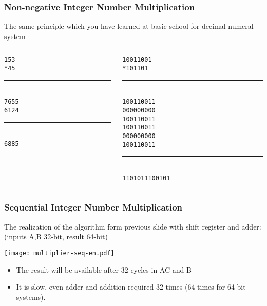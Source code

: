 \documentclass{beamer}
\begin{document}
\begin{frame}
\frametitle{Non-negative Integer Number Multiplication}

The same principle which you have learned at basic school for decimal numeral system
\begin{columns}
\begin{column}{0.4\textwidth}
\texttt{\phantom{xxx}153\phantom{xx}}\\
\texttt{\phantom{xxx}*45\phantom{xx}}\\
\vspace{-8pt}
\rule[0pt]{1.5cm}{0.1pt}\\
\texttt{\phantom{xxx}765\phantom{x}5}\\
\texttt{\phantom{xx}612\phantom{xx}4}\\
\vspace{-8pt}
\rule[0pt]{1.5cm}{0.1pt}\\
\texttt{\phantom{xx}6885\phantom{xx}}\\
\end{column}
\hfill
\begin{column}{0.4\textwidth}
\texttt{\phantom{xxxxxx}10011001\phantom{xx}}\\
\texttt{\phantom{xxxxxxx}*101101\phantom{xx}}\\
\vspace{-8pt}
\rule[0pt]{3cm}{0.4pt}\\
\texttt{\phantom{xxxxxx}10011001\phantom{x}1}\\
\texttt{\phantom{xxxxx}00000000\phantom{xx}0}\\
\texttt{\phantom{xxxx}10011001\phantom{xxx}1}\\
\texttt{\phantom{xxx}10011001\phantom{xxxx}1}\\
\texttt{\phantom{xx}00000000\phantom{xxxxx}0}\\
\texttt{\phantom{x}10011001\phantom{xxxxxx}1}\\
\vspace{-8pt}
\rule[0pt]{3cm}{0.4pt}\\
\texttt{\phantom{x}1101011100101\phantom{xx}}\\
\end{column}
\end{columns}

\end{frame}


\begin{frame}
\frametitle{Sequential Integer Number Multiplication}

The realization of the algorithm form previous slide with shift register and adder:\\
(inputs A,B 32-bit, result 64-bit)
\begin{center}
\texttt{[image: multiplier-seq-en.pdf]}
\end{center}
\begin{itemize}
\item The result will be available after 32 cycles in AC and B 
\item It is slow, even adder and addition required 32 times (64 times for 64-bit systems).
\end{itemize}
\end{frame}
\end{document}
